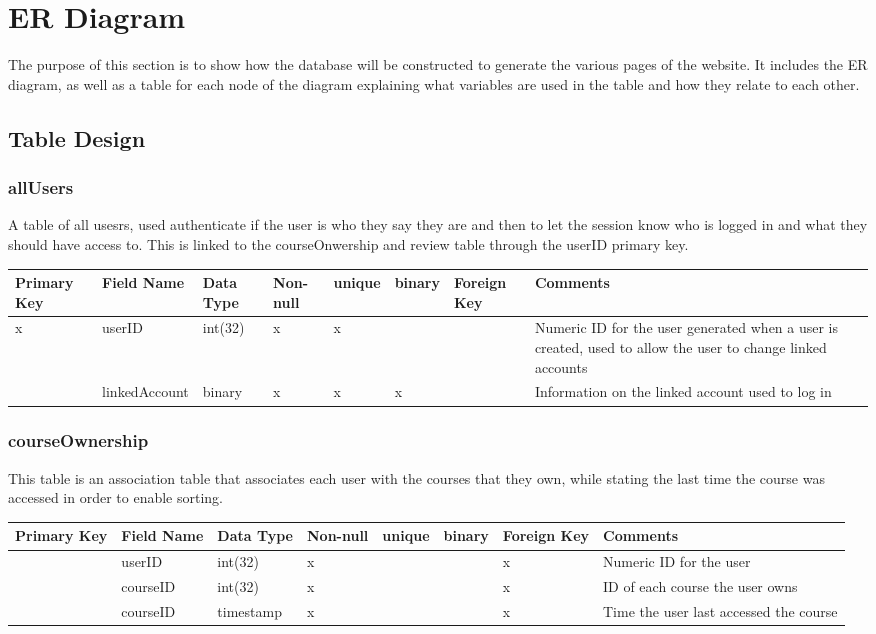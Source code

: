 \documentclass{article}
\begin{document}
\section{ER Diagram}

The purpose of this section is to show how the database will be constructed to generate the various pages of the website. It includes the ER diagram, as well as a table for each node of the diagram explaining what variables are used in the table and how they relate to each other. 



\subsection{Table Design}
\subsubsection{allUsers}
A table of all usesrs, used authenticate if the user is who they say they are and then to let the session know who is logged in and what they should have access to. This is linked to the courseOnwership and review table through the userID primary key. \\
\begin{tabular}{|m{1cm} | m{2.5cm} | m{1.5cm}| m{1cm} | m{1cm}| m{1cm} | m{1cm}| m{3.5cm}| }
  \hline
  Primary Key & Field Name & Data Type & Non-null & unique & binary & Foreign Key & Comments\\ 
  \hline
  x & userID & int(32) & x & x & & & Numeric ID for the user generated when a user is created, used to allow the user to change linked accounts\\
  \hline
   & linkedAccount & binary & x & x & x & & Information on the linked account used to log in\\
  \hline
\end{tabular}

\subsubsection{courseOwnership}
This table is an association table that associates each user with the courses that they own, while stating the last time the course was accessed in order to enable sorting. \\
\begin{tabular}{|m{1cm} | m{2cm} | m{1.5cm}| m{1cm} | m{1cm}| m{1cm} | m{1cm}| m{4cm}| }
  \hline
  Primary Key & Field Name & Data Type & Non-null & unique & binary & Foreign Key & Comments\\ 
  \hline
   & userID & int(32) & x & & & x & Numeric ID for the user\\
  \hline
   & courseID & int(32) & x & & & x & ID of each course the user owns\\
  \hline
   & courseID & timestamp & x & & & x & Time the user last accessed the course\\
  \hline
\end{tabular}
\end{document}
